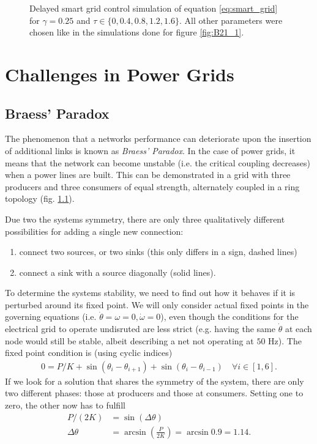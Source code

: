 \documentclass{scrartcl}
\begin{document}
\begin{figure}[h]
    \centering
    \caption{Delayed smart grid control simulation of equation
        \eqref{eq:smart_grid} for $\gamma = 0.25$ and $\tau\in \{0, 0.4,
        0.8, 1.2, 1.6\}$. All other parameters were chosen like in the
        simulations done for figure \ref{fig:B21_1}.}
    \label{fig:B23}
\end{figure}

\clearpage

\section{Challenges in Power Grids}
\subsection{Braess' Paradox}
The phenomenon that a networks performance can deteriorate upon the
insertion of additional links is known as \emph{Braess' Paradox}. In the
case of power grids, it means that the network can become unstable (i.e.
the critical coupling decreases) when a power lines are built. This can be
demonstrated in a grid with three producers and three consumers of equal
strength, alternately coupled in a ring topology (fig. \ref{}). 



Due two the systems symmetry, there are only three qualitatively different
possibilities for adding a single new connection:
\begin{enumerate}
 \item connect two sources, or two sinks (this only differs in a sign, dashed lines)
 \item connect a sink with a source diagonally (solid lines).
\end{enumerate}

To determine the systems stability, we need to find out how it behaves if
it is perturbed around its fixed point. We will only consider actual fixed
points in the governing equations (i.e. $\dot{\theta} = \omega = 0,
\dot{\omega} = 0$), even though the conditions for the electrical grid to
operate undisruted are less strict (e.g. having the same $\dot{\theta}$ at
each node would still be stable, albeit describing a net not operating at
$50$ Hz).
The fixed point condition is (using cyclic indices)
\begin{align}
 0 = P/K + \sin \left(\theta_i - \theta_{i+1} \right) + \sin \left(\theta_i - \theta_{i-1} \right) \quad \forall i \in \left[ 1, 6\right].
\end{align}
If we look for a solution that shares the symmetry of the system, there are
only two different phases: those at producers and those at consumers.
Setting one to zero, the other now has to fulfill
\begin{align}
P/(2K) &= \sin \left( \Delta \theta \right)\\
\Delta \theta &= \arcsin \left( \frac{P}{2K}\right) = \arcsin{0.9} = 1.14.
\end{align}
 
\end{document}
